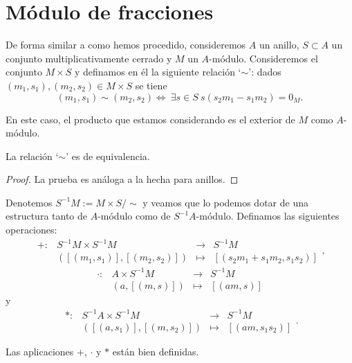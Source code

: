 \documentclass[../main.tex]{subfiles}
\begin{document}
	\section{Módulo de fracciones}
	De forma similar a como hemos procedido, consideremos $A$ un anillo, $S\subset A$ un conjunto multiplicativamente cerrado y $M$ un $A$-módulo. Consideremos el conjunto $M\times S$ y definamos en él la siguiente relación `$\sim$': dados $(m_1,s_1),(m_2,s_2)\in M\times S$ se tiene
	$$(m_1,s_1)\sim(m_2,s_2)\Longleftrightarrow\ \exists s\in S\ s(s_2m_1-s_1m_2)=0_M.$$

	\begin{remark}
		En este caso, el producto que estamos considerando es el exterior de $M$ como $A$-módulo.
	\end{remark}

	\begin{proposition}
		La relación `$\sim$' es de equivalencia.
	\end{proposition}

	\begin{proof}
		La prueba es análoga a la hecha para anillos.
	\end{proof}

	Denotemos $S^{-1}M:=M\times S/\sim$ y veamos que lo podemos dotar de una estructura tanto de $A$-módulo como de $S^{-1}A$-módulo. Definamos las siguientes operaciones:
	$$\begin{array}{rrcl}
	+:&S^{-1}M\times S^{-1}M&\longrightarrow&S^{-1}M  \\
	&([(m_1,s_1)],[(m_2,s_2)])&\longmapsto&[(s_2m_1+s_1m_2,s_1s_2)]
	\end{array},$$
	$$\begin{array}{rrcl}
	·:&A\times S^{-1}M&\longrightarrow&S^{-1}M  \\
	&(a,[(m,s)])&\longmapsto&[(am,s)]
	\end{array}$$
	y
	$$\begin{array}{rrcl}
	*:&S^{-1}A\times S^{-1}M&\longrightarrow&S^{-1}M  \\
	&([(a,s_1)],[(m,s_2)])&\longmapsto&[(am,s_1s_2)]
	\end{array}.$$

	\begin{proposition}
		Las aplicaciones $+$, $·$ y $*$ están bien definidas.
	\end{proposition}
\end{document}
